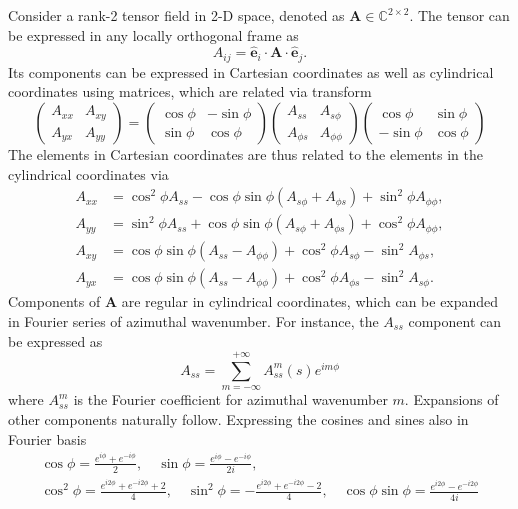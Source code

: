 Consider a rank-2 tensor field in 2-D space, denoted as $\mathbf{A} \in \mathbb{C}^{2\times 2}$. The tensor can be expressed in any locally orthogonal frame as
\[
    A_{ij} = \hat{\mathbf{e}}_i \cdot \mathbf{A} \cdot \hat{\mathbf{e}}_j.
\]
Its components can be expressed in Cartesian coordinates as well as cylindrical coordinates using matrices, which are related via transform
\[
    \begin{pmatrix} A_{xx} & A_{xy} \\ A_{yx} & A_{yy} \end{pmatrix} = 
    \begin{pmatrix} \cos\phi & -\sin\phi \\ \sin\phi & \cos\phi \end{pmatrix}
    \begin{pmatrix} A_{ss} & A_{s\phi} \\ A_{\phi s} & A_{\phi\phi} \end{pmatrix}
    \begin{pmatrix} \cos\phi & \sin\phi \\ -\sin\phi & \cos\phi \end{pmatrix}
\]
The elements in Cartesian coordinates are thus related to the elements in the cylindrical coordinates via
\[
    \begin{aligned}
        A_{xx} &= \cos^2\phi A_{ss} - \cos\phi \sin\phi \left(A_{s\phi} + A_{\phi s}\right) + \sin^2\phi A_{\phi\phi}, \\
        A_{yy} &= \sin^2\phi A_{ss} + \cos\phi \sin\phi \left(A_{s\phi} + A_{\phi s}\right) + \cos^2\phi A_{\phi\phi}, \\
        A_{xy} &= \cos\phi \sin\phi \left(A_{ss} - A_{\phi\phi}\right) + \cos^2\phi A_{s\phi} - \sin^2 A_{\phi s}, \\
        A_{yx} &= \cos\phi \sin\phi \left(A_{ss} - A_{\phi\phi}\right) + \cos^2\phi A_{\phi s} - \sin^2 A_{s \phi}.
    \end{aligned}
\]
Components of $\mathbf{A}$ are regular in cylindrical coordinates, which can be expanded in Fourier series of azimuthal wavenumber. For instance, the $A_{ss}$ component can be expressed as
\[
    A_{ss} = \sum_{m=-\infty}^{+\infty} A_{ss}^m(s) e^{im\phi}
\]
where $A_{ss}^m$ is the Fourier coefficient for azimuthal wavenumber $m$. Expansions of other components naturally follow. Expressing the cosines and sines also in Fourier basis
\[
\begin{gathered}
    \cos\phi = \frac{e^{i\phi} + e^{-i\phi}}{2},\quad \sin\phi = \frac{e^{i\phi} - e^{-i\phi}}{2i},\\
    \cos^2\phi = \frac{e^{i2\phi} + e^{-i2\phi} + 2}{4},\quad \sin^2\phi = -\frac{e^{i2\phi} + e^{-i2\phi} - 2}{4},\quad \cos\phi \sin\phi = \frac{e^{i2\phi} - e^{-i2\phi}}{4i}
\end{gathered}
\]

